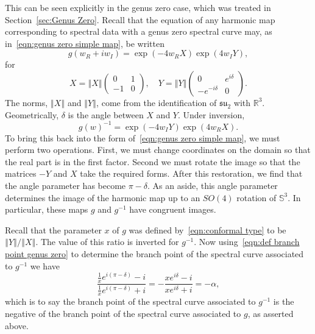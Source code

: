 \documentclass{article}
\numberwithin{equation}{section}
\numberwithin{figure}{section}
\newcommand{\norm}[1]{{\left\Vert#1\right\Vert}}
\newcommand{\iu}{i}
\newcommand{\R}{\mathbb{R}}
\renewcommand{\S}{\mathbb{S}}
\newcommand{\su}{\mathfrak{su}}
\begin{document}
This can be seen explicitly in the genus zero case, which was treated in Section~\ref{sec:Genus Zero}. Recall that the equation of any harmonic map corresponding to spectral data with a genus zero spectral curve may, as in~\eqref{eqn:genus zero simple map}, be written
\[
g(w_R + \iu w_I) = \exp (-4w_R X) \exp (4w_I Y),
\]
for
\[
X = \norm{X}\begin{pmatrix}
0 & 1 \\
-1 & 0
\end{pmatrix}, \quad
Y = \norm{Y}\begin{pmatrix}
0 & e^{\iu \delta} \\
-e^{-\iu \delta} & 0
\end{pmatrix}.
\]
The norms, $\norm{X}$ and $\norm{Y}$, come from the identification of $\su_2$ with $\R^3$. Geometrically, $\delta$ is the angle between $X$ and $Y$. Under inversion,
\[
g(w)^{-1} = \exp (-4w_I Y) \exp (4w_R X).
\]
To bring this back into the form of~\eqref{eqn:genus zero simple map}, we must perform two operations. First, we must change coordinates on the domain so that the real part is in the first factor. 
Second we must rotate the image so that the matrices $-Y$ and $X$ take the required forms. After this restoration, we find that the angle parameter has become $\pi-\delta$. As an aside, 
this angle parameter determines the image of the harmonic map up to an $SO(4)$ rotation of $\S^3$. In particular, these maps $g$ and $g^{-1}$ have congruent images.

Recall that the parameter $x$ of $g$ was defined by~\eqref{eqn:conformal type} to be $\norm{Y}/\norm{X}$. The value of this ratio is inverted for $g^{-1}$. Now using~\eqref{eqn:def branch point genus zero} to determine the branch point of the spectral curve associated to $g^{-1}$ we have
\[
\frac{\frac{1}{x} e^{\iu (\pi-\delta)} - \iu}{\frac{1}{x} e^{\iu (\pi-\delta)} + \iu}
= -\frac{x e^{\iu \delta}-\iu}{x e^{\iu \delta} + \iu} 
= -\alpha,
\]
which is to say the branch point of the spectral curve associated to $g^{-1}$ is the negative of the branch point of the spectral curve associated to $g$, as asserted above.
\end{document}
